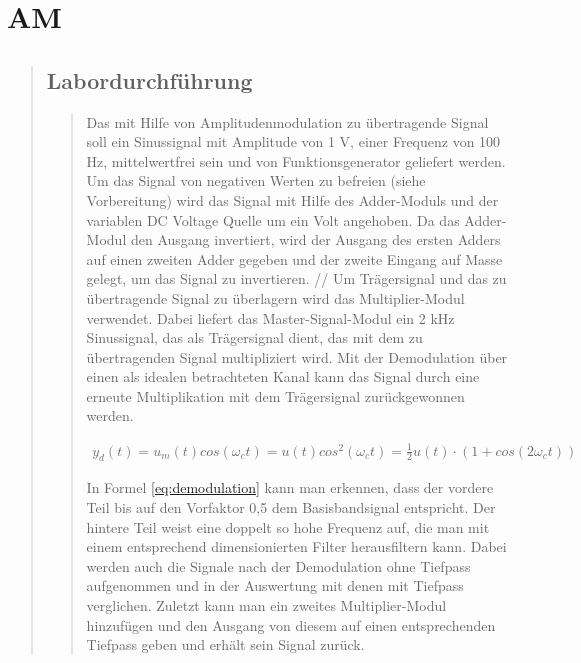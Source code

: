 \section{AM}
\begin{quote}
    
    
    \subsection{Labordurchführung}
    \begin{quote}
      Das mit Hilfe von Amplitudenmodulation zu übertragende Signal soll ein
      Sinussignal mit Amplitude von 1 V, einer Frequenz von 100 Hz, mittelwertfrei sein und von Funktionsgenerator geliefert 
      werden. Um das Signal von negativen Werten zu befreien (siehe
      Vorbereitung) wird das Signal mit Hilfe des Adder-Moduls und der variablen DC Voltage Quelle
      um ein Volt angehoben. Da das Adder-Modul den Ausgang invertiert, wird der
      Ausgang des ersten Adders auf einen zweiten Adder gegeben und der zweite
      Eingang auf Masse gelegt, um das Signal zu invertieren. //
      Um Trägersignal und das zu übertragende Signal zu überlagern wird das
      Multiplier-Modul verwendet. Dabei liefert das Master-Signal-Modul ein 2
      kHz Sinussignal, das als Trägersignal dient, das mit dem zu übertragenden
      Signal multipliziert wird.
        Mit der Demodulation über einen als idealen betrachteten Kanal kann das
        Signal durch eine erneute Multiplikation mit dem Trägersignal
        zurückgewonnen werden.
        
      \begin{equation*}
        \begin{split}
         y_{d}(t)=u_{m}(t)cos(\omega_{c}t)=u(t)cos^{2}(\omega_{c}t)=\frac{1}{2}u(t)\cdot
         (1+cos(2\omega_{c}t))
         \label{eq:demodulation}
        \end{split}
        \end{equation*}
        
        In Formel \ref{eq:demodulation} kann man erkennen, dass der vordere Teil
        bis auf den Vorfaktor 0,5 dem Basisbandsignal entspricht. Der hintere
        Teil weist eine doppelt so hohe Frequenz auf, die man mit einem
        entsprechend dimensionierten Filter herausfiltern kann.
        Dabei werden auch die Signale nach der Demodulation ohne Tiefpass
        aufgenommen und in der Auswertung mit denen mit Tiefpass verglichen.
        Zuletzt kann man ein zweites Multiplier-Modul hinzufügen und den Ausgang
        von diesem auf einen entsprechenden Tiefpass geben und erhält sein
        Signal zurück.
        

\end{quote}
\end{quote}

